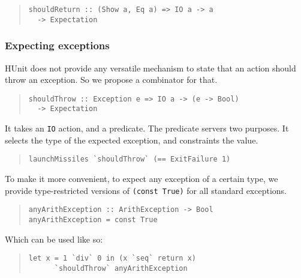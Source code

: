 \documentclass[preprint]{sigplanconf}
\begin{document}
\begin{quote}\small\begin{verbatim}
shouldReturn :: (Show a, Eq a) => IO a -> a
  -> Expectation
\end{verbatim}\end{quote}

\subsubsection{Expecting exceptions}

HUnit does not provide any versatile mechanism to state that an action
should throw an exception.  So we propose a combinator for that.

\begin{quote}\small\begin{verbatim}
shouldThrow :: Exception e => IO a -> (e -> Bool)
  -> Expectation
\end{verbatim}\end{quote}

\noindent It takes an {\tt IO} action, and a predicate.  The predicate
servers two purposes.  It selects the type of the expected exception,
and constraints the value.

\begin{quote}\small\begin{verbatim}
launchMissiles `shouldThrow` (== ExitFailure 1)
\end{verbatim}\end{quote}

\noindent To make it more convenient, to expect any exception of a
certain type, we provide type-restricted versions of {\tt (const
True)} for all standard exceptions.

\begin{quote}\small\begin{verbatim}
anyArithException :: ArithException -> Bool
anyArithException = const True
\end{verbatim}\end{quote}

\noindent Which can be used like so:

\begin{quote}\small\begin{verbatim}
let x = 1 `div` 0 in (x `seq` return x)
      `shouldThrow` anyArithException
\end{verbatim}\end{quote}
\end{document}
